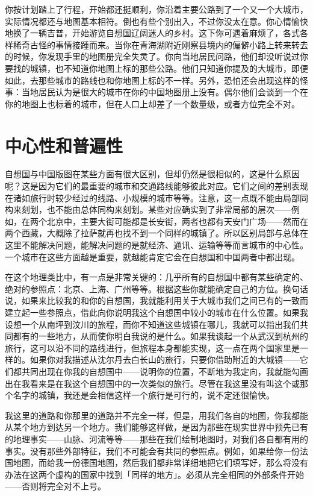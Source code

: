\documentclass[
  12pt,
  twoside,
  openright,
  oldfontcommands,
]{memoir}
\begin{document}
你按计划踏上了行程，开始都还挺顺利，你沿着主要公路到了一个又一个大城市，实际情况都还与地图基本相符。倒也有些个别出入，不过你没太在意。你心情愉快地换了一辆吉普，开始游览自想国辽阔迷人的乡村。这下你可遇着麻烦了，各式各样稀奇古怪的事情接踵而来。当你在青海湖附近刚察县境内的偏僻小路上转来转去的时候，你发现手里的地图册完全失灵了。你向当地居民问路，他们却没听说过你要找的城镇，也不知道你地图上标的那些公路。他们只知道你提及的大城市，即便如此，去那些城市的路线也和你地图上标的不一样。另外，恐怕还会出现这样的怪事：当地居民认为是很大的城市在你的中国地图册上没有。偶尔他们会谈到一个在你的地图上也标着的城市，但在人口上却差了一个数量级，或者方位完全不对。

\section{中心性和普遍性}

自想国与中国版图在某些方面有很大区别，但却仍然是很相似的，这是什么原因呢？这是因为它们的最重要的城市和交通路线能够彼此对应。它们之间的差别表现在诸如旅行时较少经过的线路、小规模的城市等等。注意，这一点既不能由局部同构来刻划，也不能由总体同构来刻划。某些对应确实到了非常局部的层次------例如，在两个北京中，主要大街可能都是长安街，两者也都有天安门广场------然而在两个西藏，大概除了拉萨就再也找不到一个同样的城镇了。所以区别局部与总体在这里不能解决问题，能解决问题的是就经济、通讯、运输等等而言城市的中心性。一个城市在这些方面越是重要，就越能肯定它会在自想国和中国两者中都出现。

在这个地理类比中，有一点是非常关键的：几乎所有的自想国中都有某些确定的、绝对的参照点：北京、上海、广州等等。根据这些你就能确定自己的方位。换句话说，如果来比较我的和你的自想国，我就能利用关于大城市我们之间已有的一致而建立起一些参照点，借此向你说明我这个自想国中较小的城市在什么位置。如果我设想一个从南坪到汶川的旅程，而你不知道这些城镇在哪儿，我就可以指出我们共同都有的一些地方，从而使你明白我说的是什么。如果我谈起一个从武汉到杭州的旅行，这可以沿不同的路线进行，但旅程本身都能实现，这一点在两个国家里是一样的。如果你对我描述从沈尔丹去白长山的旅行，只要你借助附近的大城镇------它们都共同出现在你我的自想国中------说明你的位置，不断地为我定向，我就能勾画出在我看来是在我这个自想国中的一次类似的旅行。尽管在我这里没有叫这个或那个名字的城镇，我还是会相信这样一个旅行是可行的，说不定还很愉快。

我这里的道路和你那里的道路并不完全一样，但是，用我们各自的地图，你我都能从某个地方到达另一个地方。我们能够这样做，是因为那些在现实世界中预先已有的地理事实------山脉、河流等等------那些在我们绘制地图时，对我们各自都有用的事实。没有那些外部特征，我们不可能会有共同的参照点。例如，如果给你一份法国地图，而给我一份德国地图，然后我们都非常详细地把它们填写好，那么将没有办法在这两个虚构的国家中找到「同样的地方」。必须从完全相同的外部条件开始------否则将完全对不上号。
\end{document}
